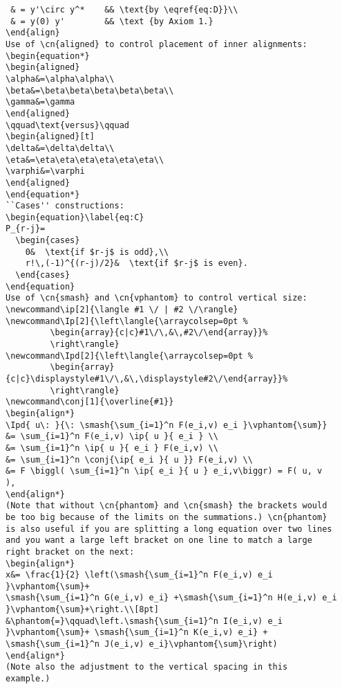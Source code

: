 \documentclass[a4paper]{article}
\newcommand{\cn}[1]{\texttt{\char92 #1}}
\begin{document}
\begin{verbatim}
 & = y'\circ y^*    && \text{by \eqref{eq:D}}\\
 & = y(0) y'        && \text {by Axiom 1.}
\end{align}
Use of \cn{aligned} to control placement of inner alignments:
\begin{equation*}
\begin{aligned}
\alpha&=\alpha\alpha\\
\beta&=\beta\beta\beta\beta\beta\\
\gamma&=\gamma
\end{aligned}
\qquad\text{versus}\qquad
\begin{aligned}[t]
\delta&=\delta\delta\\
\eta&=\eta\eta\eta\eta\eta\eta\\
\varphi&=\varphi
\end{aligned}
\end{equation*}
``Cases'' constructions:
\begin{equation}\label{eq:C}
P_{r-j}=
  \begin{cases}
    0&  \text{if $r-j$ is odd},\\
    r!\,(-1)^{(r-j)/2}&  \text{if $r-j$ is even}.
  \end{cases}
\end{equation}
Use of \cn{smash} and \cn{vphantom} to control vertical size:
\newcommand\ip[2]{\langle #1 \/ | #2 \/\rangle}
\newcommand\Ip[2]{\left\langle{\arraycolsep=0pt %
         \begin{array}{c|c}#1\/\,&\,#2\/\end{array}}%
         \right\rangle}
\newcommand\Ipd[2]{\left\langle{\arraycolsep=0pt %
         \begin{array}{c|c}\displaystyle#1\/\,&\,\displaystyle#2\/\end{array}}%
         \right\rangle}
\newcommand\conj[1]{\overline{#1}}
\begin{align*}
\Ipd{ u\: }{\: \smash{\sum_{i=1}^n F(e_i,v) e_i }\vphantom{\sum}}
&= \sum_{i=1}^n F(e_i,v) \ip{ u }{ e_i } \\
&= \sum_{i=1}^n \ip{ u }{ e_i } F(e_i,v) \\
&= \sum_{i=1}^n \conj{\ip{ e_i }{ u }} F(e_i,v) \\
&= F \biggl( \sum_{i=1}^n \ip{ e_i }{ u } e_i,v\biggr) = F( u, v
),
\end{align*}
(Note that without \cn{phantom} and \cn{smash} the brackets would
be too big because of the limits on the summations.) \cn{phantom}
is also useful if you are splitting a long equation over two lines
and you want a large left bracket on one line to match a large
right bracket on the next:
\begin{align*}
x&= \frac{1}{2} \left(\smash{\sum_{i=1}^n F(e_i,v) e_i
}\vphantom{\sum}+
\smash{\sum_{i=1}^n G(e_i,v) e_i} +\smash{\sum_{i=1}^n H(e_i,v) e_i }\vphantom{\sum}+\right.\\[8pt]
&\phantom{=}\qquad\left.\smash{\sum_{i=1}^n I(e_i,v) e_i
}\vphantom{\sum}+ \smash{\sum_{i=1}^n K(e_i,v) e_i} +
\smash{\sum_{i=1}^n J(e_i,v) e_i}\vphantom{\sum}\right)
\end{align*}
(Note also the adjustment to the vertical spacing in this
example.)


\end{verbatim}
\end{document}
